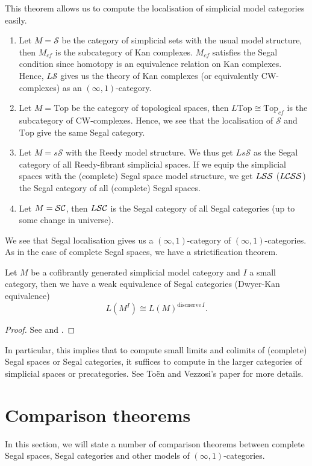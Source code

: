 This theorem allows us to compute the localisation of simplicial model categories easily.
\begin{eg}
\begin{enumerate}
\item Let $M=\mathcal S$ be the category of simplicial sets with the usual model structure, then $M_{cf}$ is the subcategory of Kan complexes. $M_{cf}$ satisfies the Segal condition since homotopy is an equivalence relation on Kan complexes. Hence, $L\mathcal S$ gives us the theory of Kan complexes (or equivalently CW-complexes) as an $(\infty,1)$-category.
\item Let $M=\mathrm{Top}$ be the category of topological spaces, then $L\mathrm{Top}\cong\mathrm{Top}_{cf}$ is the subcategory of CW-complexes. Hence, we see that the localisation of $\mathcal S$ and $\mathrm{Top}$ give the same Segal category.
\item Let $M=s\mathcal S$ with the Reedy model structure. We thus get $Ls\mathcal S$ as the Segal category of all Reedy-fibrant simplicial spaces. If we equip the simplicial spaces with the (complete) Segal space model structure, we get $L{\cal SS}$ ($L{\cal CSS}$) the Segal category of all (complete) Segal spaces.
\item Let $M={\cal SC}$, then $L{\cal SC}$ is the Segal category of all Segal categories (up to some change in universe).
\end{enumerate}
\end{eg}
We see that Segal localisation gives us a $(\infty,1)$-category of $(\infty,1)$-categories. As in the case of complete Segal spaces, we have a strictification theorem.

\begin{thm}
Let $M$ be a cofibrantly generated simplicial model category and $I$ a small category, then we have a weak equivalence of Segal categories (Dwyer-Kan equivalence)
$$L(M^I)\cong L(M)^{\mathrm{discnerve}\,I}.$$
\end{thm}
\begin{proof}
See \cite{hs} and \cite{tv}.
\end{proof}

In particular, this implies that to compute small limits and colimits of (complete) Segal spaces or Segal categories, it suffices to compute in the larger categories of simplicial spaces or precategories. See To\"en and Vezzosi's paper \cite{tv} for more details.


\section{Comparison theorems}
In this section, we will state a number of comparison theorems between complete Segal spaces, Segal categories and other models of $(\infty,1)$-categories.

